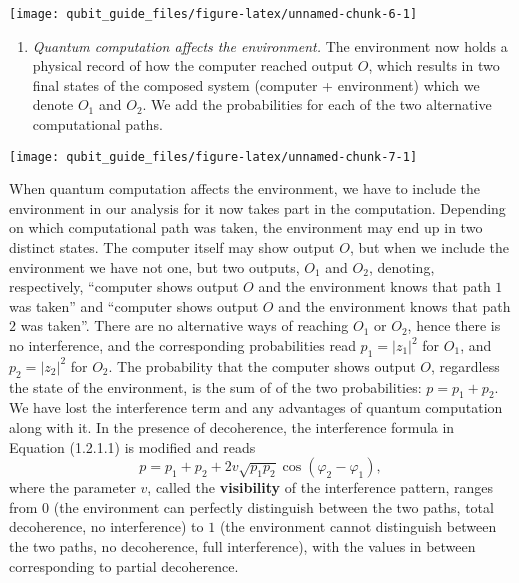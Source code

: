 \documentclass[fleqn]{article}
\providecommand{\tightlist}{%
  \setlength{\itemsep}{0pt}\setlength{\parskip}{0pt}}
\begin{document}
\begin{center}\texttt{[image: qubit\_guide\_files/figure-latex/unnamed-chunk-6-1]} \end{center}

\begin{enumerate}
\def\labelenumi{\arabic{enumi}.}
\setcounter{enumi}{1}
\tightlist
\item
  \emph{Quantum computation affects the environment.}
  The environment now holds a physical record of how the computer reached output \(O\), which results in two final states of the composed system (computer + environment) which we denote \(O_1\) and \(O_2\).
  We add the probabilities for each of the two alternative computational paths.
\end{enumerate}

\begin{center}\texttt{[image: qubit\_guide\_files/figure-latex/unnamed-chunk-7-1]} \end{center}

When quantum computation affects the environment, we have to include the environment in our analysis for it now takes part in the computation.
Depending on which computational path was taken, the environment may end up in two distinct states.
The computer itself may show output \(O\), but when we include the environment we have not one, but two outputs, \(O_1\) and \(O_2\), denoting, respectively, ``computer shows output \(O\) and the environment knows that path \(1\) was taken'' and ``computer shows output \(O\) and the environment knows that path \(2\) was taken''.
There are no alternative ways of reaching \(O_1\) or \(O_2\), hence there is no interference, and the corresponding probabilities read \(p_1=|z_1|^2\) for \(O_1\), and \(p_2=|z_2|^2\) for \(O_2\).
The probability that the computer shows output \(O\), regardless the state of the environment, is the sum of of the two probabilities: \(p=p_1+p_2\).
We have lost the interference term and any advantages of quantum computation along with it.
In the presence of decoherence, the interference formula in Equation (1.2.1.1) is modified and reads
\[
p
= p_1 + p_2 + 2 v \sqrt{p_1 p_2}\cos (\varphi_2-\varphi_1),
\]
where the parameter \(v\), called the \textbf{visibility} of the interference pattern, ranges from \(0\) (the environment can perfectly distinguish between the two paths, total decoherence, no interference) to \(1\) (the environment cannot distinguish between the two paths, no decoherence, full interference), with the values in between corresponding to partial decoherence.
\end{document}
